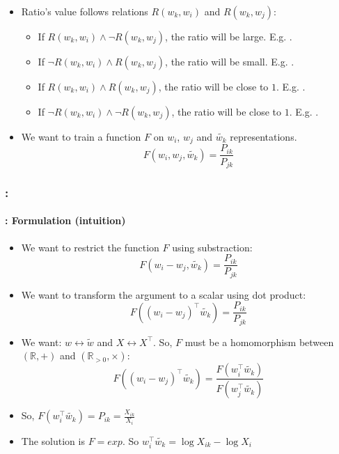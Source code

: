 \documentclass[xcolor=table]{beamer}
\begin{document}
\begin{frame}
	\begin{itemize}
		\item Ratio's value follows relations $R(w_k, w_i)$ and $R(w_k, w_j)$:
		\begin{itemize}
			\item If $R(w_k, w_i) \wedge \neg R(w_k, w_j)$, the ratio will be large. E.g. .
			\item If $\neg R(w_k, w_i) \wedge R(w_k, w_j)$, the ratio will be small. E.g. .
			\item If $R(w_k, w_i) \wedge R(w_k, w_j)$, the ratio will be close to $1$. E.g. .
			\item If $\neg R(w_k, w_i) \wedge \neg R(w_k, w_j)$, the ratio will be close to $1$. E.g. .
		\end{itemize}
		\item We want to train a function $F$ on $w_i$, $w_j$ and $\tilde{w_k}$ representations.
		\[F(w_i, w_j, \tilde{w_k}) = \frac{P_{ik}}{P_{jk}}\]
	\end{itemize}
	
\end{frame}

\begin{frame}
	\frametitle{\insertshortsubtitle: \insertsection}
	\framesubtitle{\insertsubsection: Formulation (intuition)}
	
	\begin{itemize}
		\item We want to restrict the function $F$ using substraction:
		\[F(w_i - w_j, \tilde{w_k}) = \frac{P_{ik}}{P_{jk}}\]
		
		\item We want to transform the argument to a scalar using dot product:
		\[F((w_i - w_j)^\top \tilde{w_k}) = \frac{P_{ik}}{P_{jk}}\]
		
		\item We want: $w \leftrightarrow \tilde{w}$ and $X \leftrightarrow X^\top$. 
		So, $F$ must be a homomorphism between $(\mathbb{R}, +)$ and $(\mathbb{R}_{>0}, \times)$:
		\[F((w_i - w_j)^\top \tilde{w_k}) = \frac{F(w_i^\top \tilde{w_k})}{F(w_j^\top \tilde{w_k})}\]
		
		\item So, $F(w_i^\top \tilde{w_k}) = P_{ik} = \frac{X_{ik}}{X_i}$
		
		\item The solution is $F = exp$. So $w_i^\top \tilde{w_k} = \log X_{ik} - \log X_i$
	\end{itemize}
	
\end{frame}
\end{document}
